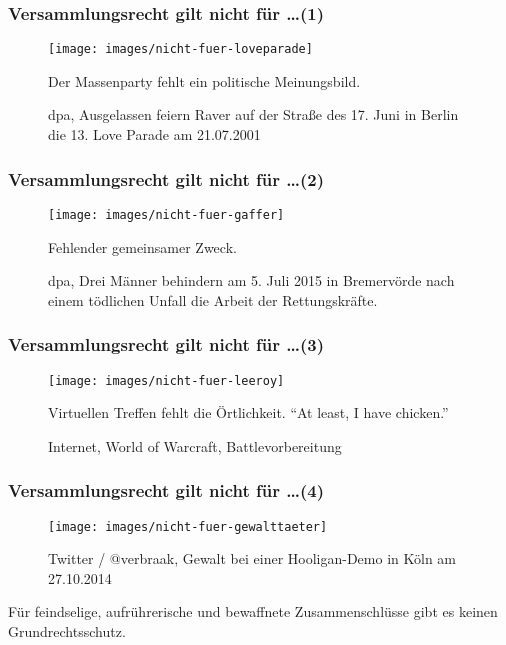 \documentclass[]{beamer}
\begin{document}
	\begin{frame}
	\frametitle{Versammlungsrecht gilt nicht für \dots (1)}
	\begin{figure}[h!]
		\renewcommand{\figurename}{Foto} 
		\texttt{[image: images/nicht-fuer-loveparade]}
		\caption{dpa, Ausgelassen feiern Raver auf der Straße des 17. Juni in Berlin die 13. Love Parade am 21.07.2001\cite{Online2014}}
		Der Massenparty fehlt ein politische Meinungsbild.
	\end{figure}
	\end{frame}

\begin{frame}
	\frametitle{Versammlungsrecht gilt nicht für \dots (2)}
	\begin{figure}[h!]
		\renewcommand{\figurename}{Foto} 
		\texttt{[image: images/nicht-fuer-gaffer]}
		\caption{dpa, Drei Männer behindern am 5. Juli 2015 in Bremervörde nach einem tödlichen Unfall die Arbeit der Rettungskräfte.}
		Fehlender gemeinsamer Zweck.
	\end{figure}
\end{frame}

\begin{frame}
	\frametitle{Versammlungsrecht gilt nicht für \dots (3)}
	\begin{figure}[h!]
		\renewcommand{\figurename}{Foto} 
		\texttt{[image: images/nicht-fuer-leeroy]}
		\caption{Internet, World of Warcraft, Battlevorbereitung}
		Virtuellen Treffen fehlt die Örtlichkeit. \enquote{At least, I have chicken.}
	\end{figure}
\end{frame}

\begin{frame}
	\frametitle{Versammlungsrecht gilt nicht für \dots (4)}
	\begin{figure}[h!]
		\renewcommand{\figurename}{Foto} 
		\texttt{[image: images/nicht-fuer-gewalttaeter]}
		\caption{Twitter / @verbraak, Gewalt bei einer Hooligan-Demo in Köln am 27.10.2014}
	\end{figure}
	Für feindselige, aufrührerische und bewaffnete Zusammenschlüsse gibt es keinen Grundrechtsschutz.
	\end{frame}
\end{document}
